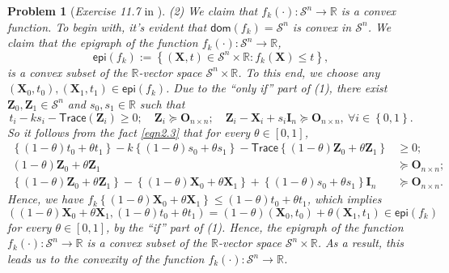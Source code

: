 \documentclass[11pt]{article}
\newtheorem{problem}{Problem}
\numberwithin{equation}{problem}
\begin{document}
\begin{problem} [\emph{Exercise 11.7} in \cite{calafiore2014optimization}]
{\indent (2) We claim that $f_k (\cdot) : \mathcal{S}^n \rightarrow \mathbb{R}$ is a convex function. To begin with, it's evident that $\textsf{dom} \left( f_k \right) = \mathcal{S}^n$ is convex in $\mathcal{S}^n$. We claim that the epigraph of the function $f_k (\cdot) : \mathcal{S}^n \rightarrow \mathbb{R}$,
\begin{equation*}
    \textsf{epi} \left( f_k \right) :=
    \left\{ \left( \mathbf{X}, t \right) \in \mathcal{S}^n \times \mathbb{R} : f_k (\mathbf{X}) \leq t \right\},
\end{equation*}
is a convex subset of the $\mathbb{R}$-vector space $\mathcal{S}^n \times \mathbb{R}$. To this end, we choose any $\left( \mathbf{X}_0, t_0 \right), \left( \mathbf{X}_1, t_1 \right) \in \textsf{epi} \left( f_k \right)$. Due to the ``only if'' part of (1), there exist $\mathbf{Z}_0, \mathbf{Z}_1 \in \mathcal{S}^n$ and $s_0, s_1 \in \mathbb{R}$ such that
\begin{equation}
    \label{eqn2.3}
    t_i - k s_i - \textsf{Trace} \left( \mathbf{Z}_i \right) \geq 0; \quad
    \mathbf{Z}_i \succeq \mathbf{O}_{n \times n}; \quad
    \mathbf{Z}_i - \mathbf{X}_i + s_i \mathbf{I}_n \succeq \mathbf{O}_{n \times n},\ \forall i \in \left\{ 0, 1 \right\}.
\end{equation}
So it follows from the fact \eqref{eqn2.3} that for every $\theta \in [0, 1]$,
\begin{equation*}
    \begin{split}
        \left\{ \left( 1 - \theta \right) t_0 + \theta t_1 \right\} - k \left\{ \left( 1 - \theta \right) s_0 + \theta s_1 \right\} - 
        \textsf{Trace} \left\{ \left( 1 - \theta \right) \mathbf{Z}_0 + \theta \mathbf{Z}_1 \right\} &\geq 0; \\
        \left( 1 - \theta \right) \mathbf{Z}_0 + \theta \mathbf{Z}_1 &\succeq \mathbf{O}_{n \times n}; \\
        \left\{ \left( 1 - \theta \right) \mathbf{Z}_0 + \theta \mathbf{Z}_1 \right\} - \left\{ \left( 1 - \theta \right) \mathbf{X}_0 + \theta \mathbf{X}_1 \right\} + \left\{ \left( 1 - \theta \right) s_0 + \theta s_1 \right\} \mathbf{I}_n & \succeq \mathbf{O}_{n \times n}.
    \end{split}
\end{equation*}
Hence, we have $f_k \left\{ \left( 1 - \theta \right) \mathbf{X}_0 + \theta \mathbf{X}_1 \right\} \leq \left( 1 - \theta \right) t_0 + \theta t_1$, which implies
\begin{equation*}
    \left( \left( 1 - \theta \right) \mathbf{X}_0 + \theta \mathbf{X}_1, \left( 1 - \theta \right) t_0 + \theta t_1 \right)
    = \left( 1 - \theta \right) \left( \mathbf{X}_0, t_0 \right) + \theta \left( \mathbf{X}_1, t_1 \right) \in \textsf{epi} \left( f_k \right)
\end{equation*}
for every $\theta \in [0, 1]$, by the ``if'' part of (1). Hence, the epigraph of the function $f_k (\cdot) : \mathcal{S}^n \rightarrow \mathbb{R}$ is a convex subset of the $\mathbb{R}$-vector space $\mathcal{S}^n \times \mathbb{R}$. As a result, this leads us to the convexity of the function $f_k (\cdot) : \mathcal{S}^n \rightarrow \mathbb{R}$. 
\medskip

}
\end{problem}
\end{document}
